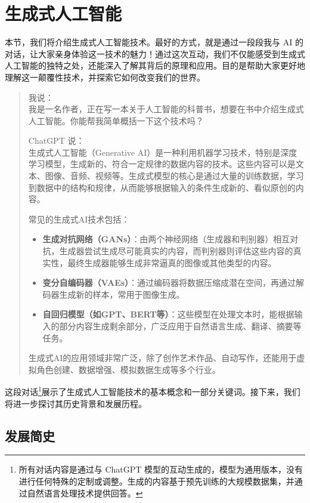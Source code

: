 \section{生成式人工智能}

本节，我们将介绍生成式人工智能技术。最好的方式，就是通过一段段我与 AI 的对话，让大家亲身体验这一技术的魅力！通过这次互动，我们不仅能感受到生成式人工智能的独特之处，还能深入了解其背后的原理和应用。目的是帮助大家更好地理解这一颠覆性技术，并探索它如何改变我们的世界。

\begin{quote}
我说：\\
我是一名作者，正在写一本关于人工智能的科普书，想要在书中介绍生成式人工智能。你能帮我简单概括一下这个技术吗？

ChatGPT 说：\\
生成式人工智能（Generative AI）是一种利用机器学习技术，特别是深度学习模型，生成新的、符合一定规律的数据内容的技术。这些内容可以是文本、图像、音频、视频等。生成式模型的核心是通过大量的训练数据，学习到数据中的结构和规律，从而能够根据输入的条件生成新的、看似原创的内容。

常见的生成式AI技术包括：

\begin{itemize}
  \item \textbf{生成对抗网络（GANs）}：由两个神经网络（生成器和判别器）相互对抗，生成器尝试生成尽可能真实的内容，而判别器则评估这些内容的真实性，最终生成器能够生成非常逼真的图像或其他类型的内容。
  \item \textbf{变分自编码器（VAEs）}：通过编码器将数据压缩成潜在空间，再通过解码器生成新的样本，常用于图像生成。
  \item \textbf{自回归模型（如GPT、BERT等）}：这些模型在处理文本时，能根据输入的部分内容生成剩余部分，广泛应用于自然语言生成、翻译、摘要等任务。
\end{itemize}

生成式AI的应用领域非常广泛，除了创作艺术作品、自动写作，还能用于虚拟角色创建、数据增强、模拟数据生成等多个行业。
\end{quote}


这段对话\footnote{所有对话内容是通过与 ChatGPT 模型的互动生成的，模型为通用版本，没有进行任何特殊的定制或调整。生成的内容基于预先训练的大规模数据集，并通过自然语言处理技术提供回答。 }展示了生成式人工智能技术的基本概念和一部分关键词。接下来，我们将进一步探讨其历史背景和发展历程。



\subsection{发展简史}

